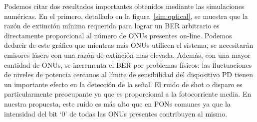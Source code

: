Podemos citar dos resultados importantes obtenidos mediante las simulaciones numéricas. 
En el primero, detallado en la figura~\ref{sim:optical}, se muestra que la razón de extinción mínima requerida para lograr un BER arbitrario es directamente proporcional al número de ONUs presentes on-line.
Podemos deducir de este gráfico que mientras más ONUs utilicen el sistema, se necesitarán emisores lásers con una razón de extinción mas elevada. Además, con una mayor cantidad de ONUs, se incrementa el BER por problemas físicos: las fluctuaciones de niveles de potencia cercanos al límite de sensibilidad del dispositivo PD tienen un importante efecto en la detección de la señal.
El ruido de shot o disparo es particularmente preocupante ya que es proporcional a la fotocorriente media. En nuestra propuesta, este ruido es más alto que en PONs comunes ya que la intensidad del bit `0' de todas las ONUs presentes contribuyen al mismo.
